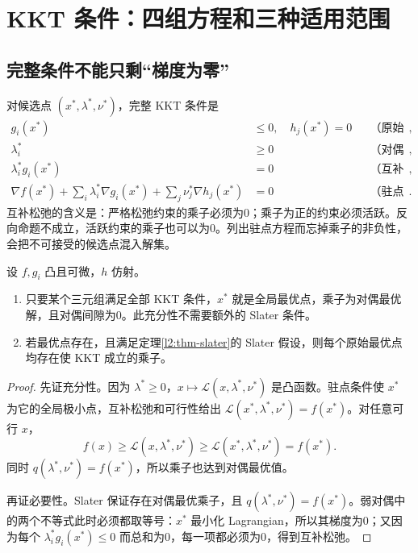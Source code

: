 \section{KKT 条件：四组方程和三种适用范围}
\label{l2:kkt}

\subsection{完整条件不能只剩“梯度为零”}

对候选点 $(x^*,\lambda^*,\nu^*)$，完整 KKT 条件是
\begin{align}
 g_i(x^*)&\leq0,\quad h_j(x^*)=0
 &&\text{（原始可行性）},\label{l2:kkt-primal}\\
 \lambda_i^*&\geq0
 &&\text{（对偶可行性）},\label{l2:kkt-dual}\\
 \lambda_i^*g_i(x^*)&=0
 &&\text{（互补松弛）},\label{l2:kkt-complementarity}\\
 \nabla f(x^*)+\sum_i\lambda_i^*\nabla g_i(x^*)
       +\sum_j\nu_j^*\nabla h_j(x^*)&=0
 &&\text{（驻点条件）}.
 \label{l2:kkt-stationarity}
\end{align}
互补松弛的含义是：严格松弛约束的乘子必须为0；乘子为正的约束必须活跃。反向命题不成立，活跃约束的乘子也可以为0。列出驻点方程而忘掉乘子的非负性，会把不可接受的候选点混入解集。

\begin{theorem}
\label{l2:thm-convex-kkt}
设 $f,g_i$ 凸且可微，$h$ 仿射。
\begin{enumerate}
 \item 只要某个三元组满足全部 KKT 条件，$x^*$ 就是全局最优点，乘子为对偶最优解，且对偶间隙为0。此充分性不需要额外的 Slater 条件。
 \item 若最优点存在，且满足定理\ref{l2:thm-slater}的 Slater 假设，则每个原始最优点均存在使 KKT 成立的乘子。
\end{enumerate}
\end{theorem}

\begin{proof}
先证充分性。因为 $\lambda^*\geq0$，$x\mapsto\mathcal L(x,\lambda^*,\nu^*)$ 是凸函数。驻点条件使 $x^*$ 为它的全局极小点，互补松弛和可行性给出 $\mathcal L(x^*,\lambda^*,\nu^*)=f(x^*)$。对任意可行 $x$，
\[
 f(x)\geq\mathcal L(x,\lambda^*,\nu^*)
 \geq\mathcal L(x^*,\lambda^*,\nu^*)=f(x^*).
\]
同时 $q(\lambda^*,\nu^*)=f(x^*)$，所以乘子也达到对偶最优值。

再证必要性。Slater 保证存在对偶最优乘子，且 $q(\lambda^*,\nu^*)=f(x^*)$。弱对偶中的两个不等式此时必须都取等号：$x^*$ 最小化 Lagrangian，所以其梯度为0；又因为每个 $\lambda_i^*g_i(x^*)\leq0$ 而总和为0，每一项都必须为0，得到互补松弛。
\end{proof}

